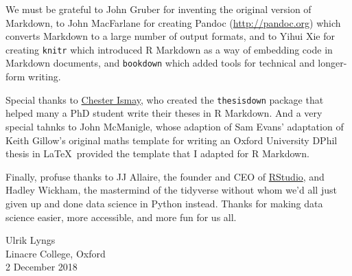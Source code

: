 \documentclass[a4paper, nobind]{templates/iheidthesis}
\begin{document}
We must be grateful to John Gruber for inventing the original version of Markdown, to John MacFarlane for creating Pandoc (\url{http://pandoc.org}) which converts Markdown to a large number of output formats, and to Yihui Xie for creating \texttt{knitr} which introduced R Markdown as a way of embedding code in Markdown documents, and \texttt{bookdown} which added tools for technical and longer-form writing.

Special thanks to \href{http://chester.rbind.io}{Chester Ismay}, who created the \texttt{thesisdown} package that helped many a PhD student write their theses in R Markdown. And a very special tahnks to John McManigle, whose adaption of Sam Evans' adaptation of Keith Gillow's original maths template for writing an Oxford University DPhil thesis in \LaTeX~provided the template that I adapted for R Markdown.

Finally, profuse thanks to JJ Allaire, the founder and CEO of \href{http://rstudio.com}{RStudio}, and Hadley Wickham, the mastermind of the tidyverse without whom we'd all just given up and done data science in Python instead. Thanks for making data science easier, more accessible, and more fun for us all.

\begin{flushright}
Ulrik Lyngs \\
Linacre College, Oxford \\
2 December 2018
\end{flushright}
% 

\begin{abstract}
	This \emph{R Markdown} template is for writing an Oxford University thesis. The template is built using Yihui Xie's \texttt{bookdown} package, with heavy inspiration from Chester Ismay's \texttt{thesisdown} and the \texttt{OxThesis} \LaTeX~template (most recently adapted by John McManigle).

This template's sample content include illustrations of how to write a thesis in R Markdown, and largely follows the structure from \href{https://ulyngs.github.io/rmarkdown-workshop-2019/}{this R Markdown workshop}.

Congratulations for taking a step further into the lands of open, reproducible science by writing your thesis using a tool that allows you to transparently include tables and dynamically generated plots directly from the underlying data. Hip hooray!
\end{abstract}
\end{document}
